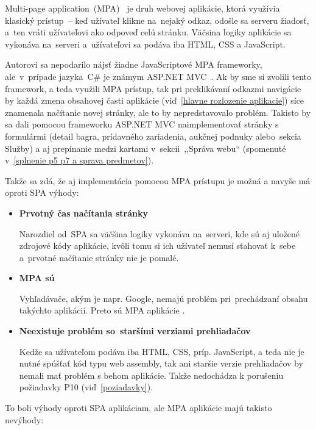 Multi-page application~(MPA)~\cite{mpa} je druh webovej aplikácie, ktorá využívia klasický prístup~-- keď užívateľ klikne na~nejaký odkaz, odošle sa serveru žiadosť, a~ten vráti užívateľovi ako odpoveď celú stránku. Väčsina logiky aplikácie sa vykonáva na~serveri a~užívateľovi sa podáva iba HTML, CSS a JavaScript.

Autorovi sa nepodarilo nájsť žiadne JavaScriptové MPA frameworky, ale~v~prípade jazyka~C\# je známym ASP.NET MVC~\cite{aspnetmvc}. Ak by sme si zvolili tento framework, a teda využili MPA prístup, tak pri preklikávaní odkazmi navigácie by každá zmena obsahovej časti aplikácie (viď~\ref{hlavne rozlozenie aplikacie}) síce znamenala načítanie novej stránky, ale to by nepredstavovalo problém. Takisto by sa dali pomocou frameworku ASP.NET MVC naimplementovať stránky s formulármi (detail bagra, prídavného zariadenia, aukčnej podnuky alebo~sekcia Služby) a aj prepínanie medzi kartami v~sekcii~,,Správa webu`` (spomenuté v~\ref{splnenie p5 p7 a sprava predmetov}).

Takže sa zdá, že aj implementácia pomocou MPA prístupu je možná a navyše má oproti SPA výhody:

\begin{itemize}
\item \textbf{Prvotný čas načítania stránky}

Narozdiel od~SPA sa väčšina logiky vykonáva na~serveri, kde sú aj uložené zdrojové kódy aplikácie, kvôli tomu si ich užívateľ nemusí sťahovať k~sebe a~prvotné načítanie stránky nie je pomalé.

\item \textbf{MPA sú }

Vyhľadávače, akým je napr. Google, nemajú problém pri~prechádzaní obsahu takýchto aplikácií. Preto sú MPA aplikácie .

\item \textbf{Neexistuje problém so~staršími verziami prehliadačov}

Kedže sa užívateľom podáva iba HTML, CSS, príp. JavaScript, a teda nie je nutné spúšťať kód typu web assembly, tak ani staršie verzie prehliadačov by nemali mať problém s behom aplikácie. Takže nedochádza k porušeniu požiadavky P10 (viď~\ref{poziadavky}).
\end{itemize}

To boli výhody oproti SPA aplikáciam, ale MPA aplikácie majú takisto nevýhody:

